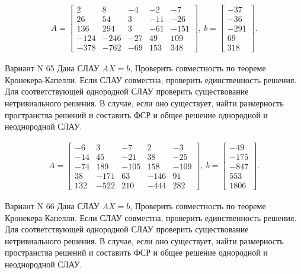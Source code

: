 \documentclass[11pt]{report}
\begin{document}
\begin{align*}
 A = \left[\begin{matrix}2 & 8 & -4 & -2 & -7\\26 & 54 & 3 & -11 & -26\\136 & 294 & 3 & -61 & -151\\-124 & -246 & -27 & 49 & 109\\-378 & -762 & -69 & 153 & 348\end{matrix}\right],
\ b = \left[\begin{matrix}-37\\-36\\-291\\69\\318\end{matrix}\right]. 
 \end{align*}

Вариант N 65
Дана СЛАУ $AX = b$,
Проверить совместность по теореме Кронекера-Капелли. Если СЛАУ совместна, проверить единственность решения.
Для соответствующей однородной СЛАУ проверить существование нетривиального решения. В случае, если оно существует,
найти размерность пространства решений и составить ФСР и общее решение однородной  и неоднородной СЛАУ.


\begin{align*}
 A = \left[\begin{matrix}-6 & 3 & -7 & 2 & -3\\-14 & 45 & -21 & 38 & -25\\-74 & 189 & -105 & 158 & -109\\38 & -171 & 63 & -146 & 91\\132 & -522 & 210 & -444 & 282\end{matrix}\right],
\ b = \left[\begin{matrix}-49\\-175\\-847\\553\\1806\end{matrix}\right]. 
 \end{align*}

Вариант N 66
Дана СЛАУ $AX = b$,
Проверить совместность по теореме Кронекера-Капелли. Если СЛАУ совместна, проверить единственность решения.
Для соответствующей однородной СЛАУ проверить существование нетривиального решения. В случае, если оно существует,
найти размерность пространства решений и составить ФСР и общее решение однородной  и неоднородной СЛАУ.
\end{document}
